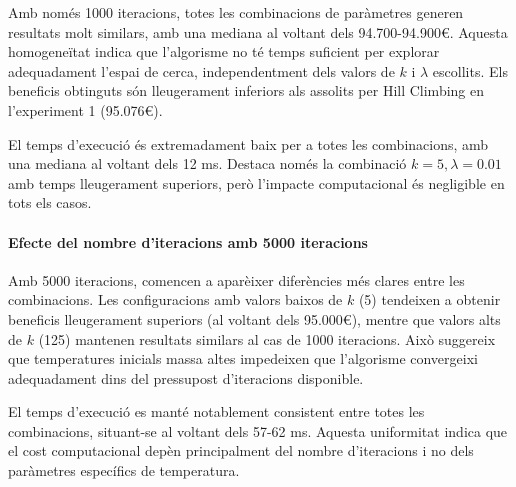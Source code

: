 \vspace{0.5cm}

\vspace{0.5cm}

Amb només 1000 iteracions, totes les combinacions de paràmetres generen resultats molt similars, amb una mediana al voltant dels 94.700-94.900€. Aquesta homogeneïtat indica que l'algorisme no té temps suficient per explorar adequadament l'espai de cerca, independentment dels valors de $k$ i $\lambda$ escollits. Els beneficis obtinguts són lleugerament inferiors als assolits per Hill Climbing en l'experiment 1 (95.076€).

\vspace{0.5cm}

\vspace{0.5cm}

El temps d'execució és extremadament baix per a totes les combinacions, amb una mediana al voltant dels 12 ms. Destaca només la combinació $k=5, \lambda=0.01$ amb temps lleugerament superiors, però l'impacte computacional és negligible en tots els casos.

\paragraph{Efecte del nombre d'iteracions amb 5000 iteracions}

\vspace{0.5cm}

\vspace{0.5cm}

Amb 5000 iteracions, comencen a aparèixer diferències més clares entre les combinacions. Les configuracions amb valors baixos de $k$ (5) tendeixen a obtenir beneficis lleugerament superiors (al voltant dels 95.000€), mentre que valors alts de $k$ (125) mantenen resultats similars al cas de 1000 iteracions. Això suggereix que temperatures inicials massa altes impedeixen que l'algorisme convergeixi adequadament dins del pressupost d'iteracions disponible.

\vspace{0.5cm}

\vspace{0.5cm}

El temps d'execució es manté notablement consistent entre totes les combinacions, situant-se al voltant dels 57-62 ms. Aquesta uniformitat indica que el cost computacional depèn principalment del nombre d'iteracions i no dels paràmetres específics de temperatura.

